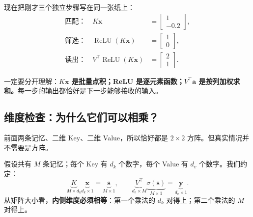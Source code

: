 \documentclass[11pt,a4paper,UTF8]{ctexart}
\numberwithin{equation}{section}
\newcommand{\vect}[1]{\boldsymbol{#1}}
\newcommand{\relu}{\operatorname{ReLU}}
\begin{document}
现在把刚才三个独立步骤写在同一张纸上：
\begin{align}
\text{匹配：}\quad
K\vect{x}
&=\begin{bmatrix}1\\-0.2\end{bmatrix},\\
\text{筛选：}\quad
\relu(K\vect{x})
&=\begin{bmatrix}1\\0\end{bmatrix},\\
\text{读出：}\quad
V^\top\relu(K\vect{x})
&=\begin{bmatrix}2\\1\end{bmatrix}.
\end{align}

\begin{center}
\end{center}

\begin{conclusion}
一定要分开理解：\textbf{$K\vect{x}$ 是批量点积；ReLU 是逐元素函数；$V^\top\vect{a}$ 是按列加权求和。}每一步的输出都恰好是下一步能够接收的输入。
\end{conclusion}

\subsection{维度检查：为什么它们可以相乘？}

前面两条记忆、二维 Key、二维 Value，所以恰好都是 $2\times2$ 方阵。但真实情况并不需要是方阵。

假设共有 $M$ 条记忆；每个 Key 有 $d_k$ 个数字，每个 Value 有 $d_v$ 个数字。我们约定：
\[
\underbrace{K}_{M\times d_k}
\underbrace{\vect{x}}_{d_k\times1}
=\underbrace{\vect{s}}_{M\times1},
\qquad
\underbrace{V^\top}_{d_v\times M}
\underbrace{\sigma(\vect{s})}_{M\times1}
=\underbrace{\vect{y}}_{d_v\times1}.
\]
从矩阵大小看，\textbf{内侧维度必须相等}：第一个乘法的 $d_k$ 对得上；第二个乘法的 $M$ 对得上。
\end{document}

